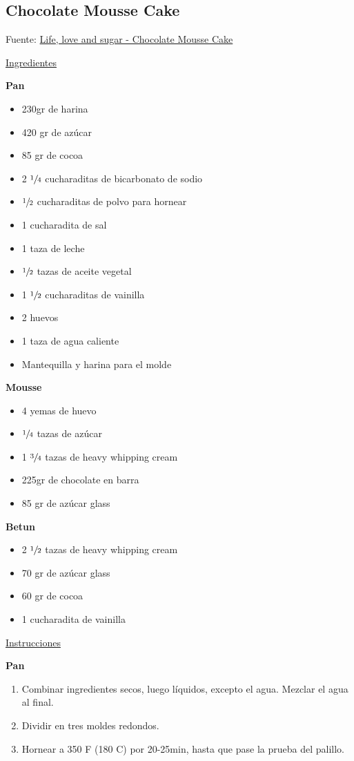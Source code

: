 \subsection{Chocolate Mousse Cake}

Fuente: \href{https://www.lifeloveandsugar.com/2017/10/23/chocolate-mousse-cake/}{Life, love and sugar - Chocolate Mousse Cake}

\underline{Ingredientes}

\textbf{Pan}
\begin{itemize}
\item 230gr de harina
\item 420 gr de azúcar
\item 85 gr de cocoa
\item 2 $\sfrac{1}{4}$ cucharaditas de bicarbonato de sodio
\item $\sfrac{1}{2}$ cucharaditas de polvo para hornear
\item 1 cucharadita de sal
\item 1 taza de leche
\item $\sfrac{1}{2}$ tazas de aceite vegetal
\item 1 $\sfrac{1}{2}$ cucharaditas de vainilla
\item 2 huevos
\item 1 taza de agua caliente
\item Mantequilla y harina para el molde
\end{itemize}

\textbf{Mousse}
\begin{itemize}
\item 4 yemas de huevo
\item $\sfrac{1}{4}$ tazas de azúcar
\item 1 $\sfrac{3}{4}$ tazas de heavy whipping cream
\item 225gr de chocolate en barra
\item 85 gr de azúcar glass 
\end{itemize}

\textbf{Betun}
\begin{itemize}
\item 2 $\sfrac{1}{2}$ tazas de heavy whipping cream
\item 70 gr de azúcar glass
\item 60 gr de cocoa
\item 1 cucharadita de vainilla
\end{itemize}

\underline{Instrucciones}

\textbf{Pan}
\begin{enumerate}
\item Combinar ingredientes secos, luego líquidos, excepto el agua. Mezclar el agua al final.
\item Dividir en tres moldes redondos.
\item Hornear a 350 F (180 C) por 20-25min, hasta que pase la prueba del palillo.
\end{enumerate}

